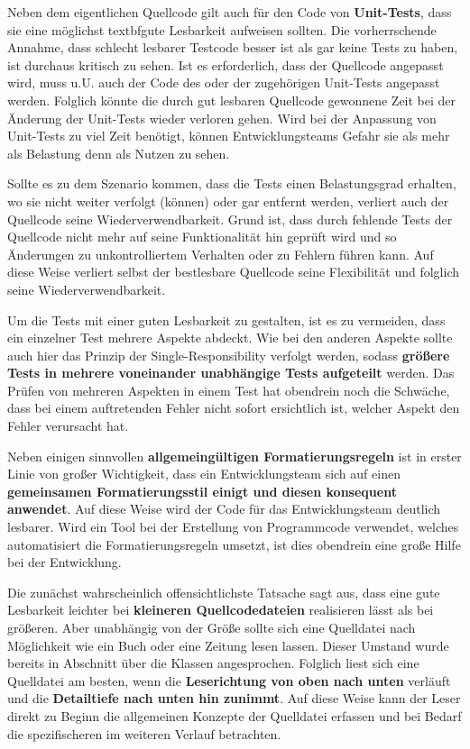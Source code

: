 \documentclass[utf8,biblatex]{lni}
\begin{document}

Neben dem eigentlichen Quellcode gilt auch für den Code von \textbf{Unit-Tests}, dass sie eine möglichst textbf{gute Lesbarkeit} aufweisen sollten. Die vorherrschende Annahme, dass schlecht lesbarer Testcode besser ist als gar keine Tests zu haben, ist durchaus kritisch zu sehen. Ist es erforderlich, dass der Quellcode angepasst wird, muss u.U. auch der Code des oder der zugehörigen Unit-Tests angepasst werden. Folglich könnte die durch gut lesbaren Quellcode gewonnene Zeit bei der Änderung der Unit-Tests wieder verloren gehen. Wird bei der Anpassung von Unit-Tests zu viel Zeit benötigt, können Entwicklungsteams Gefahr sie als mehr als Belastung denn als Nutzen zu sehen.

Sollte es zu dem Szenario kommen, dass die Tests einen Belastungsgrad erhalten, wo sie nicht weiter verfolgt (können) oder gar entfernt werden, verliert auch der Quellcode seine Wiederverwendbarkeit. Grund ist, dass durch fehlende Tests der Quellcode nicht mehr auf seine Funktionalität hin geprüft wird und so Änderungen zu unkontrolliertem Verhalten oder zu Fehlern führen kann. Auf diese Weise verliert selbst der bestlesbare Quellcode seine Flexibilität und folglich seine Wiederverwendbarkeit.

Um die Tests mit einer guten Lesbarkeit zu gestalten, ist es zu vermeiden, dass ein einzelner Test mehrere Aspekte abdeckt. Wie bei den anderen Aspekte sollte auch hier das Prinzip der Single-Responsibility verfolgt werden, sodass \textbf{größere Tests in mehrere voneinander unabhängige Tests aufgeteilt} werden. Das Prüfen von mehreren Aspekten in einem Test hat obendrein noch die Schwäche, dass bei einem auftretenden Fehler nicht sofort ersichtlich ist, welcher Aspekt den Fehler verursacht hat.


Neben einigen sinnvollen \textbf{allgemeingültigen Formatierungsregeln} ist in erster Linie von großer Wichtigkeit, dass ein Entwicklungsteam sich auf einen \textbf{gemeinsamen Formatierungsstil einigt und diesen konsequent anwendet}. Auf diese Weise wird der Code für das Entwicklungsteam deutlich lesbarer. Wird ein Tool bei der Erstellung von Programmcode verwendet, welches automatisiert die Formatierungsregeln umsetzt, ist dies obendrein eine große Hilfe bei der Entwicklung.

Die zunächst wahrscheinlich offensichtlichste Tatsache sagt aus, dass eine gute Lesbarkeit leichter bei \textbf{kleineren Quellcodedateien} realisieren lässt als bei größeren. Aber unabhängig von der Größe sollte sich eine Quelldatei nach Möglichkeit wie ein Buch oder eine Zeitung lesen lassen. Dieser Umstand wurde bereits in Abschnitt über die Klassen angesprochen. Folglich liest sich eine Quelldatei am besten, wenn die \textbf{Leserichtung von oben nach unten} verläuft und die \textbf{Detailtiefe nach unten hin zunimmt}. Auf diese Weise kann der Leser direkt zu Beginn die allgemeinen Konzepte der Quelldatei erfassen und bei Bedarf die spezifischeren im weiteren Verlauf betrachten.
\end{document}
